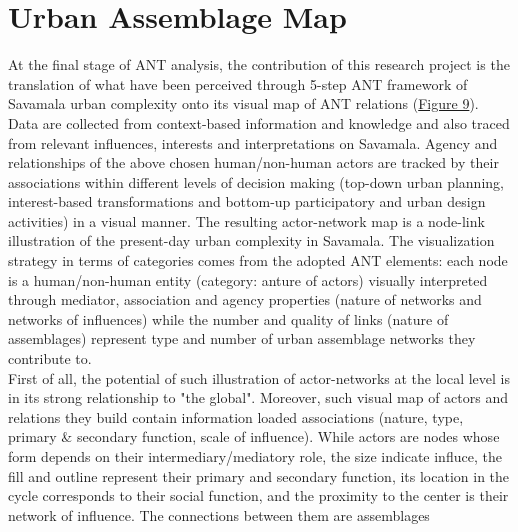\documentclass[11pt]{report}
\begin{document}

\section{Urban Assemblage Map}

At the final stage of ANT analysis, the contribution of this research project is the translation of what have been perceived through 5-step ANT framework of Savamala urban complexity onto its visual map of ANT relations (\href{}{Figure 9}). 
\\

Data are collected from context-based information and knowledge and also traced from relevant influences, interests and interpretations on Savamala.
Agency and relationships of the above chosen human/non-human actors are tracked by their associations within different levels of decision making (top-down urban planning, interest-based transformations and bottom-up participatory and urban design activities) in a visual manner.
The resulting actor-network map is a node-link illustration of the present-day urban complexity in Savamala.
The visualization strategy in terms of categories comes from the adopted ANT elements: each node is a human/non-human entity (category: anture of actors) visually interpreted through mediator, association and agency properties (nature of networks and networks of influences) while the number and quality of links (nature of assemblages) represent type and number of urban assemblage networks they contribute to.
\\

First of all, the potential of such illustration of actor-networks at the local level is in its strong relationship to "the global".
Moreover, such visual map of actors and relations they build contain information loaded associations (nature, type, primary \& secondary function, scale of influence).
While actors are nodes whose form depends on their intermediary/mediatory role, the size indicate influce, the fill and outline represent their primary and secondary function, its location in the cycle corresponds to their social function, and the proximity to the center is their network of influence.
The connections between them are assemblages
\\
\end{document}
